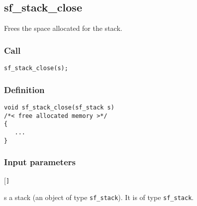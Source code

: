 \subsection{{sf\_stack\_close}}
Frees the space allocated for the stack.

\subsubsection*{Call}
\begin{verbatim}sf_stack_close(s);\end{verbatim}

\subsubsection*{Definition}
\begin{verbatim}
void sf_stack_close(sf_stack s)
/*< free allocated memory >*/
{
   ...
}
\end{verbatim}

\subsubsection*{Input parameters}
\begin{desclist}{\tt }{\quad}[\tt ]
   \setlength\itemsep{0pt}
   \item[s] a stack (an object of type \texttt{sf\_stack}). It is of type \texttt{sf\_stack}.
\end{desclist}



